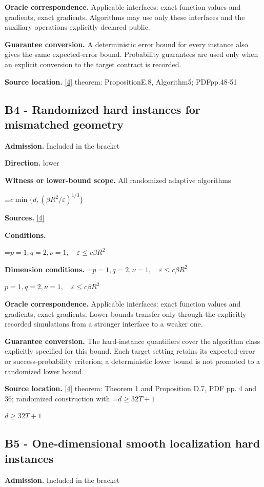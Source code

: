\documentclass[10pt,a4paper]{article}
\newcommand{\AtlasMath}[1]{\par\begingroup\centering\setbox0=\hbox{$\displaystyle #1$}\ifdim\wd0>1.4\linewidth\typeout{ATLAS WIDE FORMULA: \the\wd0}\fi\ifdim\wd0>\linewidth\resizebox{\linewidth}{!}{\box0}\else\box0\fi\par\endgroup}
\newcommand{\AtlasInlineMath}[1]{\begingroup\setbox0=\hbox{$#1$}\ifdim\wd0>.4\linewidth\endgroup\AtlasMath{#1}\else\endgroup$#1$\fi}
\begin{document}
\textbf{Oracle correspondence.} Applicable interfaces: exact function values and gradients, exact gradients. Algorithms may use only these interfaces and the auxiliary operations explicitly declared public.

\textbf{Guarantee conversion.} A deterministic error bound for every instance also gives the same expected-error bound. Probability guarantees are used only when an explicit conversion to the target contract is recorded.

\textbf{Source location.} \href{https://arxiv.org/pdf/2609.32910}{[4]} theorem: PropositionE.8, Algorithm5; PDFpp.48-51

\subsection{B4 - Randomized hard instances for mismatched geometry}
\textbf{Admission.} Included in the bracket

\textbf{Direction.} lower

\textbf{Witness or lower-bound scope.} All randomized adaptive algorithms

\AtlasMath{c\min\{d,(\beta R^2/\varepsilon)^{1/3}\}}
\textbf{Sources.} \href{https://arxiv.org/pdf/2609.32910}{[4]}

\textbf{Conditions.} 
\AtlasMath{p=1,q=2,\nu=1,\quad\varepsilon\le c\beta R^2}


\textbf{Dimension conditions.} \AtlasInlineMath{p=1,q=2,\nu=1,\quad\varepsilon\le c\beta R^2}

\textbf{Oracle correspondence.} Applicable interfaces: exact function values and gradients, exact gradients. Lower bounds transfer only through the explicitly recorded simulations from a stronger interface to a weaker one.

\textbf{Guarantee conversion.} The hard-instance quantifiers cover the algorithm class explicitly specified for this bound. Each target setting retains its expected-error or success-probability criterion; a deterministic lower bound is not promoted to a randomized lower bound.

\textbf{Source location.} \href{https://arxiv.org/pdf/2609.32910}{[4]} theorem: Theorem 1 and Proposition D.7, PDF pp. 4 and 36; randomized construction with \AtlasInlineMath{d\ge32T+1}

\subsection{B5 - One-dimensional smooth localization hard instances}
\textbf{Admission.} Included in the bracket
\end{document}
